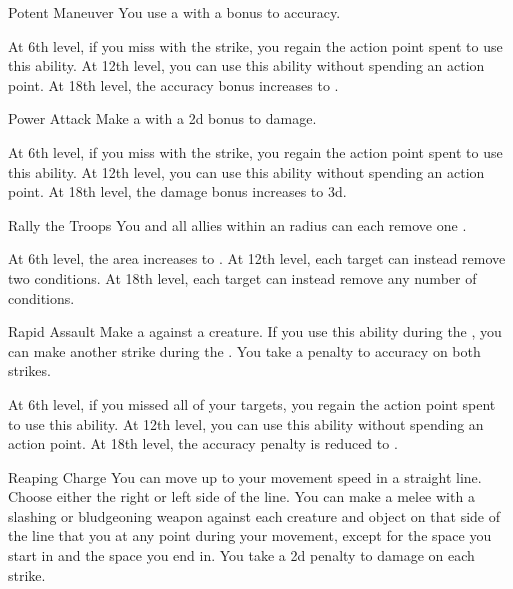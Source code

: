 {            \begin{ability}{Potent Maneuver}
                You use a  with a  bonus to accuracy.

                At 6th level, if you miss with the strike, you regain the action point spent to use this ability.
                At 12th level, you can use this ability without spending an action point.
                At 18th level, the accuracy bonus increases to .
            \end{ability}

            \begin{ability}{Power Attack}
                Make a  with a \plus2d bonus to damage.

                At 6th level, if you miss with the strike, you regain the action point spent to use this ability.
                At 12th level, you can use this ability without spending an action point.
                At 18th level, the damage bonus increases to \plus3d.
            \end{ability}

            \begin{ability}{Rally the Troops}
                You and all allies within an \areamed radius can each remove one .

                At 6th level, the area increases to \arealarge.
                At 12th level, each target can instead remove two conditions.
                At 18th level, each target can instead remove any number of conditions.
            \end{ability}

            \begin{ability}{Rapid Assault}
                Make a  against a creature.
                If you use this ability during the , you can make another strike during the .
                You take a  penalty to accuracy on both strikes.

                At 6th level, if you missed all of your targets, you regain the action point spent to use this ability.
                At 12th level, you can use this ability without spending an action point.
                At 18th level, the accuracy penalty is reduced to .
            \end{ability}

            \begin{ability}{Reaping Charge}
                You can move up to your movement speed in a straight line.
                Choose either the right or left side of the line.
                You can make a melee  with a slashing or bludgeoning weapon against each creature and object on that side of the line that you  at any point during your movement, except for the space you start in and the space you end in.
                You take a \minus2d penalty to damage on each strike.


\end{ability}}

